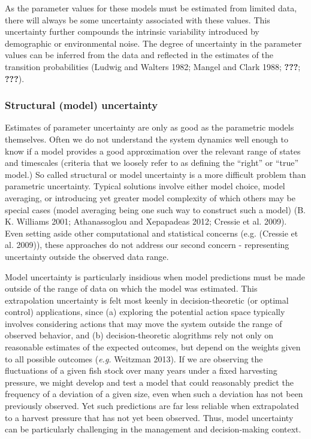 \documentclass[author-year, review]{elsarticle} %
\begin{document}
As the parameter values for these models must be estimated from limited
data, there will always be some uncertainty associated with these
values. This uncertainty further compounds the intrinsic variability
introduced by demographic or environmental noise. The degree of
uncertainty in the parameter values can be inferred from the data and
reflected in the estimates of the transition probabilities (Ludwig and
Walters 1982; Mangel and Clark 1988; {\textbf{???}}; {\textbf{???}}).

\subsubsection{Structural (model)
uncertainty}\label{structural-model-uncertainty}

Estimates of parameter uncertainty are only as good as the parametric
models themselves. Often we do not understand the system dynamics well
enough to know if a model provides a good approximation over the
relevant range of states and timescales (criteria that we loosely refer
to as defining the ``right'' or ``true'' model.) So called structural or
model uncertainty is a more difficult problem than parametric
uncertainty. Typical solutions involve either model choice, model
averaging, or introducing yet greater model complexity of which others
may be special cases (model averaging being one such way to construct
such a model) (B. K. Williams 2001; Athanassoglou and Xepapadeas 2012;
Cressie et al. 2009). Even setting aside other computational and
statistical concerns (e.g. (Cressie et al. 2009)), these approaches do
not address our second concern - representing uncertainty outside the
observed data range.

Model uncertainty is particularly insidious when model predictions must
be made outside of the range of data on which the model was estimated.
This extrapolation uncertainty is felt most keenly in decision-theoretic
(or optimal control) applications, since (a) exploring the potential
action space typically involves considering actions that may move the
system outside the range of observed behavior, and (b)
decision-theoretic alogrithms rely not only on reasonable estimates of
the expected outcomes, but depend on the weights given to all possible
outcomes (\emph{e.g.} Weitzman 2013). If we are observing the
fluctuations of a given fish stock over many years under a fixed
harvesting pressure, we might develop and test a model that could
reasonably predict the frequency of a deviation of a given size, even
when such a deviation has not been previously observed. Yet such
predictions are far less reliable when extrapolated to a harvest
pressure that has not yet been observed. Thus, model uncertainty can be
particularly challenging in the management and decision-making context.
\end{document}
